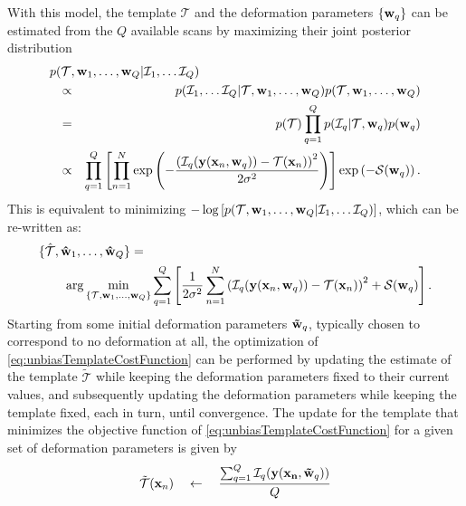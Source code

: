 \documentclass[10pt,twoside]{book}
\begin{document}
With this model, the template $\mathcal{T}$ and the
deformation parameters $\{\mathbf{w}_q\}$ can be estimated from the $Q$ available scans by maximizing their joint posterior distribution%
\begin{eqnarray}
  p( \mathcal{T}, \fat{w}_1, \ldots, \fat{w}_Q | \mathcal{I}_1, \ldots \mathcal{I}_Q) \hspace{-3.9cm} &  & \nonumber\\
  & \propto & p( \mathcal{I}_1, \ldots \mathcal{I}_Q | \mathcal{T}, \fat{w}_1, \ldots, \fat{w}_Q ) p( \mathcal{T}, \fat{w}_1, \ldots, \fat{w}_Q ) \nonumber\\
  & =       & p( \mathcal{T} ) \prod_{q=1}^Q p( \mathcal{I}_q | \mathcal{T}, \fat{w}_q ) p( \fat{w}_q ) \nonumber\\
  & \propto & \prod_{q=1}^Q \left[ \prod_{n=1}^N \exp\left( -\frac{\left( \mathcal{I}_q( \fat{y}(\fat{x}_n, \fat{w}_q ) ) - \mathcal{T}(\fat{x}_n) \right)^2}{2\sigma^2} \right) \right]
                                             \exp\left( -\mathcal{S}(\fat{w}_q)\right).
\end{eqnarray}
This is equivalent to minimizing $-\log\left[ p( \mathcal{T}, \mathbf{w}_1, \ldots, \mathbf{w}_Q | \mathcal{I}_1, \ldots \mathcal{I}_Q) \right]$, which can be re-written as:
\begin{eqnarray}
  \{ \hat{\mathcal{T}}, \fat{\hat{w}}_1, \ldots, \fat{\hat{w}}_Q \} = \hspace{80mm} \nonumber \\
  \arg \min_{ \{ \mathcal{T}, \fat{w}_1, \ldots, \fat{w}_Q \} }
  \sum_{q=1}^Q \left[
  \frac{1}{2\sigma^2}\sum_{n=1}^N
  \left(\mathcal{I}_q(\fat{y}(\fat{x}_n,\fat{w}_q))-\mathcal{T}(\fat{x}_n)\right)^2 
  + \mathcal{S}(\fat{w}_q)
  \right].
  \label{eq:unbiasTemplateCostFunction}
\end{eqnarray}
Starting from some initial deformation parameters $\mathbf{\tilde{w}}_q$, typically chosen to correspond to no deformation at all, 
the optimization of \eqref{eq:unbiasTemplateCostFunction} can be performed by updating the estimate of the template $\mathcal{\tilde{T}}$ 
while keeping the deformation parameters fixed to their current values, and subsequently updating the deformation parameters while 
keeping the template fixed, each in turn, until convergence. The update for the template that minimizes the objective function of 
\eqref{eq:unbiasTemplateCostFunction} 
for a given set of deformation parameters is given by
\begin{equation}
  \mathcal{\tilde{T}}( \mathbf{x}_n ) \quad \gets \quad \frac{ \sum_{q=1}^Q \mathcal{I}_q( \mathbf{y}( \mathbf{x_n}, \mathbf{\tilde{w}}_q ) ) }
                                                          {Q} 
  \label{eq:templateUpdate}
\end{equation}
\end{document}
